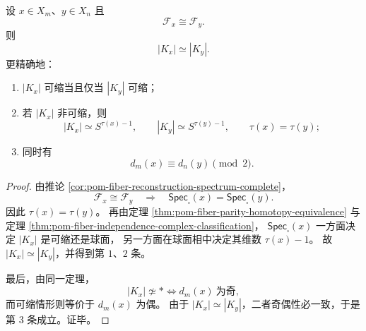\begin{theorem}[图同构诱导的同伦刚性与奇偶守恒]\label{thm:conclusion-fiber-isomorphic-homotopy-rigidity}
设 \(x\in X_m\)、\(y\in X_n\) 且
\[
\mathcal F_x\cong \mathcal F_y.
\]
则
\[
|K_x|\simeq |K_y|.
\]
更精确地：
\begin{enumerate}
\item \(|K_x|\) 可缩当且仅当 \(|K_y|\) 可缩；
\item 若 \(|K_x|\) 非可缩，则
\[
|K_x|\simeq S^{\tau(x)-1},
\qquad
|K_y|\simeq S^{\tau(y)-1},
\qquad
\tau(x)=\tau(y);
\]
\item 同时有
\[
d_m(x)\equiv d_n(y)\pmod 2.
\]
\end{enumerate}
\end{theorem}
\begin{proof}
由推论 \ref{cor:pom-fiber-reconstruction-spectrum-complete}，
\[
\mathcal F_x\cong \mathcal F_y
\quad\Longrightarrow\quad
\mathsf{Spec}_{\square}(x)=\mathsf{Spec}_{\square}(y).
\]
因此 \(\tau(x)=\tau(y)\)。
再由定理 \ref{thm:pom-fiber-parity-homotopy-equivalence} 与定理 \ref{thm:pom-fiber-independence-complex-classification}，
\(
\mathsf{Spec}_{\square}(x)
\)
一方面决定 \(|K_x|\) 是可缩还是球面，
另一方面在球面相中决定其维数
\(
\tau(x)-1
\)。
故 \(|K_x|\simeq |K_y|\)，并得到第 \(1\)、\(2\) 条。

最后，由同一定理，
\[
|K_x|\not\simeq *
\iff
d_m(x)\ \text{为奇},
\]
而可缩情形则等价于 \(d_m(x)\) 为偶。
由于 \(|K_x|\simeq |K_y|\)，二者奇偶性必一致，于是第 \(3\) 条成立。证毕。
\end{proof}

